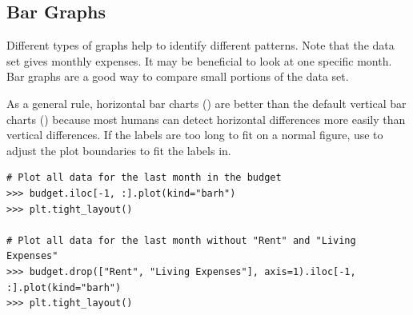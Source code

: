 \subsection*{Bar Graphs}

Different types of graphs help to identify different patterns.
Note that the data set  gives monthly expenses.
It may be beneficial to look at one specific month.
Bar graphs are a good way to compare small portions of the data set.

As a general rule, horizontal bar charts () are better than the default vertical bar charts () because most humans can detect horizontal differences more easily than vertical differences.
If the labels are too long to fit on a normal figure, use  to adjust the plot boundaries to fit the labels in.

\begin{lstlisting}
# Plot all data for the last month in the budget
>>> budget.iloc[-1, :].plot(kind="barh")
>>> plt.tight_layout()

# Plot all data for the last month without "Rent" and "Living Expenses"
>>> budget.drop(["Rent", "Living Expenses"], axis=1).iloc[-1, :].plot(kind="barh")
>>> plt.tight_layout()
\end{lstlisting}

